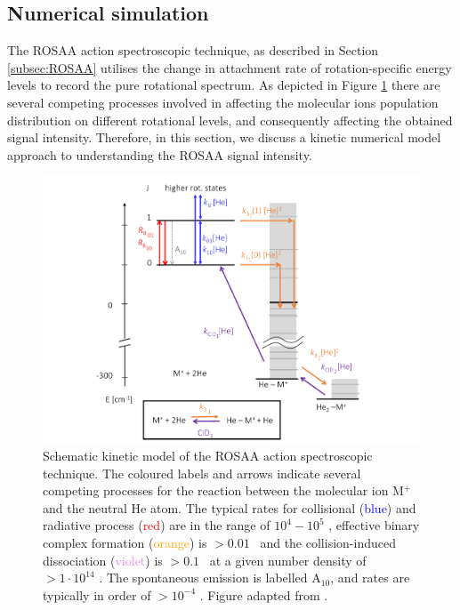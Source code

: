 \subsection{Numerical simulation}
\label{subsec:ROSAA-simulation}

The ROSAA action spectroscopic technique, as described in Section \ref{subsec:ROSAA} utilises the change in attachment rate of rotation-specific energy levels to record the pure rotational spectrum. As depicted in Figure \ref{fig:setup:ROSAA} there are several competing processes involved in affecting the molecular ions population distribution on different rotational levels, and consequently affecting the obtained signal intensity. Therefore, in this section, we discuss a kinetic numerical model approach to understanding the ROSAA signal intensity.

\begin{figure}[!htb]
    \centering
    
    \includegraphics[width=1\textwidth]{figures/methods/ROSAA.pdf}
    \caption{Schematic kinetic model of the ROSAA action spectroscopic technique. The coloured labels and arrows indicate several competing processes for the reaction between the molecular ion M$^+$ and the neutral He atom. The typical rates for collisional (\textcolor{blue}{blue}) and radiative process (\textcolor{red}{red}) are in the range of $10^{4} - 10^{5}$ \pers, effective binary complex formation (\textcolor{orange}{orange}) is $> 0.01$ \pers\ and the collision-induced dissociation (\textcolor{violet}{violet}) is $> 0.1$ \pers\ at a given number density of $> 1 \cdot 10^{14}$ \percc. The spontaneous emission is labelled A$_{10}$, and rates are typically in order of $> 10^{-4}$ \pers. Figure adapted from \citet{Brunken2017}.}
    \label{fig:setup:ROSAA}
\end{figure}

